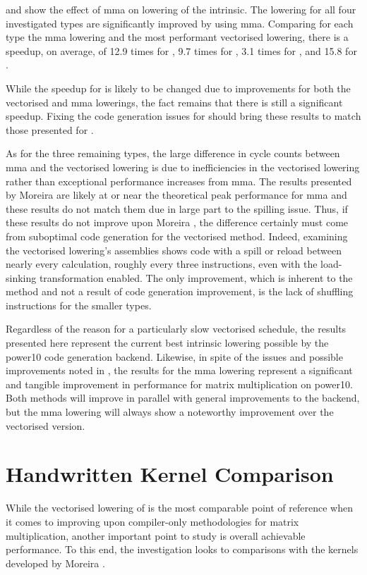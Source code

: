 \documentclass[\main/thesis.tex]{subfiles}
\begin{document}
 and  show the effect of \gls{mma} on lowering of the  intrinsic.
The lowering for all four investigated types are significantly improved by using \gls{mma}.
Comparing for each type the \gls{mma} lowering and the most performant vectorised lowering, there is a speedup, on average, of 12.9 times for , 9.7 times for , 3.1 times for , and 15.8 for .

While the speedup for  is likely to be changed due to improvements for both the vectorised and \gls{mma} lowerings, the fact remains that there is still a significant speedup.
Fixing the code generation issues for  should bring these results to match those presented for .

As for the three remaining types, the large difference in cycle counts between \gls{mma} and the vectorised lowering is due to inefficiencies in the vectorised lowering rather than exceptional performance increases from \gls{mma}.
The results presented by Moreira \etal are likely at or near the theoretical peak performance for \gls{mma} and these results do not match them due in large part to the spilling issue.
Thus, if these results do not improve upon Moreira \etal, the difference certainly must come from suboptimal code generation for the vectorised method.
Indeed, examining the vectorised lowering's assemblies shows code with a spill or reload between nearly every calculation, roughly every three instructions, even with the load-sinking transformation enabled.
The only improvement, which is inherent to the method and not a result of code generation improvement, is the lack of shuffling instructions for the smaller types.

Regardless of the reason for a particularly slow vectorised schedule, the results presented here represent the current best intrinsic lowering possible by the \gls{power10} code generation backend.
Likewise, in spite of the issues and possible improvements noted in , the results for the \gls{mma} lowering represent a significant and tangible improvement in performance for matrix multiplication on \gls{power10}.
Both methods will improve in parallel with general improvements to the backend, but the \gls{mma} lowering will always show a noteworthy improvement over the vectorised version.

\section{Handwritten Kernel Comparison}
While the vectorised lowering of  is the most comparable point of reference when it comes to improving upon compiler-only methodologies for matrix multiplication, another important point to study is overall achievable performance.
To this end, the investigation looks to comparisons with the kernels developed by Moreira \etal.
\end{document}
